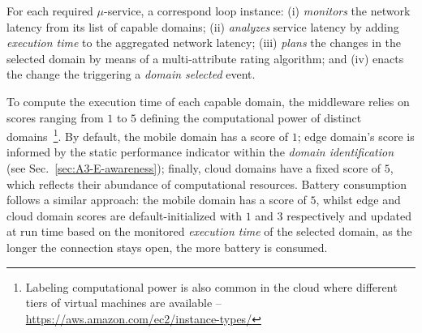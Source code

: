 
For each required $\mu$-service, a correspond loop instance: (i) \textit{monitors} the network latency from its list of capable domains; (ii) \textit{analyzes} service latency by adding \textit{execution time} to the aggregated network latency;  (iii) \textit{plans} the changes in the selected domain by means of a multi-attribute rating algorithm; and (iv) enacts the change the triggering a \textit{domain selected} event.



To compute the execution time of each capable domain, the middleware relies on scores ranging from $1$ to $5$ defining the computational power of distinct domains~\footnote{Labeling computational power is also common in the cloud where different tiers of virtual machines are available -- \url{https://aws.amazon.com/ec2/instance-types/}}. By default, the mobile domain has a score of $1$; edge domain's score is informed by the static performance indicator within the \textit{domain identification} (see Sec.~\ref{sec:A3-E-awareness}); finally, cloud domains have a fixed score of $5$, which reflects their abundance of computational resources. Battery consumption follows a similar approach: the mobile domain has a score of $5$, whilst edge and cloud domain scores are default-initialized with $1$ and $3$ respectively and updated at run time based on the monitored \textit{execution time} of the selected domain, as the longer the connection stays open, the more battery is consumed.



